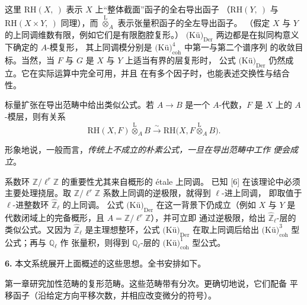 \clearpage
{}
这里 $\mathrm{RH}(X,{\ })$ 表示 $X$ 上“整体截面”函子的全右导出函子
（$\mathrm{RH}(Y,{\ })$ 与 $\mathrm{RH}(X\times Y,{\ })$ 同理），而
$\overset{\mathrm L}{\otimes}_A$ 表示张量积函子的全左导出函子。
（假定 $X$ 与 $Y$ 的上同调维数有限，例如它们是有限胞腔复形。）
$\text{(Kü)}_{\mathrm{Der}}$ 两边都是在拟同构意义下确定的 $A$-模复形，
其上同调模分别是 $\text{(Kü)}_{\mathrm{coh}}^{4}$ 中第一与第二个谱序列
的收敛目标。当然，当 $F$ 与 $G$ 是 $X$ 与 $Y$ 上适当有界的层复形时，
公式 $\text{(Kü)}_{\mathrm{Der}}$ 仍然成立。它在实际运算中完全可用，并且
在有多个因子时，也能表述交换性与结合性。

标量扩张在导出范畴中给出类似公式。若 $A\to B$ 是一个 $A$-代数，$F$ 是
$X$ 上的 $A$-模层，则有关系
\[
\mathrm{RH}(X,F)\overset{\mathrm L}{\otimes}_A B
\xrightarrow{\sim}
\mathrm{RH}\bigl(X,F\overset{\mathrm L}{\otimes}_A B\bigr).
\]

形象地说，一般而言，\emph{传统上不成立的朴素公式，一旦在导出范畴中工作
便会成立}。

系数环 $\mathbb Z/\ell^r\mathbb Z$ 的重要性尤其来自概形的 étale 上同调。
已知 [6] 在该理论中必须主要处理挠层。取
$\mathbb Z/\ell^r\mathbb Z$ 系数上同调的逆极限，就得到 $\ell$-进上同调，
即取值于 $\ell$-进整数环 $\widehat{\mathbb Z}_{\ell}$ 的上同调。
公式 $\text{(Kü)}_{\mathrm{Der}}$ 在这一背景下仍成立（例如 $X$ 与 $Y$
是代数闭域上的完备概形，且 $A=\mathbb Z/\ell^r\mathbb Z$），并可立即
通过逆极限，给出 $\widehat{\mathbb Z}_{\ell}$-层的类似公式。又因为
$\widehat{\mathbb Z}_{\ell}$ 是主理想整环，公式
$\text{(Kü)}_{\mathrm{Der}}$ 在取上同调后给出
$\text{(Kü)}_{\mathrm{coh}}^{3}$ 型公式；再与 $\mathbb Q_{\ell}$ 作
张量积，则得到 $\mathbb Q_{\ell}$-层的
$\text{(Kü)}_{\mathrm{coh}}^{1}$ 型公式。

\noindent\textbf{6.}\quad
本文系统展开上面概述的这些思想。全书安排如下。

第一章研究加性范畴的复形范畴。这些范畴带有分次。更确切地说，它们配备
平移函子（沿给定方向平移次数，并相应改变微分的符号）。
